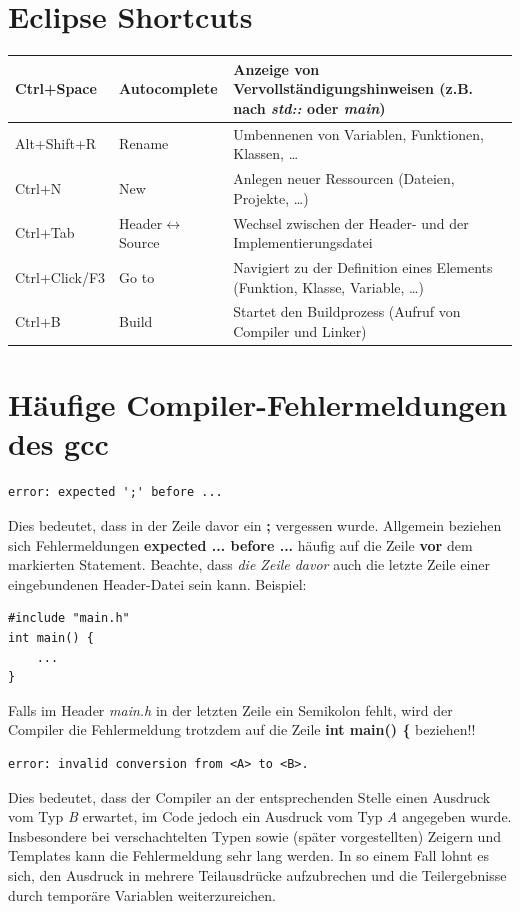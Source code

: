 \documentclass[
  accentcolor=tud1c,	%
  colorbacktitle,		%
  inverttitle,			%
  german,
  twoside
]{tudreport}
\begin{document}
\section{Eclipse Shortcuts}
\begin{tabular}{l|l|p{11.5cm}}
	Ctrl+Space & Autocomplete &
	Anzeige von Vervollständigungshinweisen (z.B. nach \emph{std::} oder \emph{main})
	\\\hline
	Alt+Shift+R & Rename &
	Umbennenen von Variablen, Funktionen, Klassen, \dots
	\\\hline
	Ctrl+N & New &
	Anlegen neuer Ressourcen (Dateien, Projekte, \dots)
	\\\hline
	Ctrl+Tab & Header$\leftrightarrow$Source &
	Wechsel zwischen der Header- und der Implementierungsdatei
	\\\hline
	Ctrl+Click/F3 & Go to &
	Navigiert zu der Definition eines Elements (Funktion, Klasse, Variable, \dots)
	\\\hline
	Ctrl+B & Build &
	Startet den Buildprozess (Aufruf von Compiler und Linker)
\end{tabular}

\section{Häufige Compiler-Fehlermeldungen des gcc}

\begin{verbatim}
error: expected ';' before ...
\end{verbatim}

Dies bedeutet, dass in der Zeile davor ein \textbf{;} vergessen wurde.
Allgemein beziehen sich Fehlermeldungen \textbf{expected ... before ...} häufig auf die Zeile \textbf{vor} dem markierten Statement.
Beachte, dass \emph{die Zeile davor} auch die letzte Zeile einer eingebundenen Header-Datei sein kann. Beispiel:

\begin{lstlisting}
#include "main.h"
int main() {
	...
}
\end{lstlisting}

Falls im Header \emph{main.h} in der letzten Zeile ein Semikolon fehlt, wird der Compiler die Fehlermeldung trotzdem auf die Zeile \textbf{int main() \{} beziehen!!

\begin{verbatim}
error: invalid conversion from <A> to <B>.
\end{verbatim}

Dies bedeutet, dass der Compiler an der entsprechenden Stelle einen Ausdruck vom Typ \emph{B} erwartet, im Code jedoch ein Ausdruck vom Typ \emph{A} angegeben wurde. Insbesondere bei verschachtelten Typen sowie (später vorgestellten) Zeigern und Templates kann die Fehlermeldung sehr lang werden. In so einem Fall lohnt es sich, den Ausdruck in mehrere Teilausdrücke aufzubrechen und die Teilergebnisse durch temporäre Variablen weiterzureichen.
\end{document}
